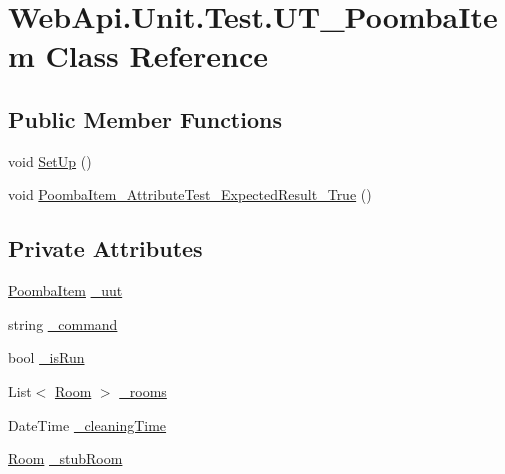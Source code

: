 \hypertarget{class_web_api_1_1_unit_1_1_test_1_1_u_t___poomba_item}{}\section{Web\+Api.\+Unit.\+Test.\+U\+T\+\_\+\+Poomba\+Item Class Reference}
\label{class_web_api_1_1_unit_1_1_test_1_1_u_t___poomba_item}
\subsection*{Public Member Functions}
\begin{DoxyCompactItemize}
\item 
void \mbox{\hyperlink{class_web_api_1_1_unit_1_1_test_1_1_u_t___poomba_item_a08fa150e21140cb190dda15f1e67de2b}{Set\+Up}} ()
\item 
void \mbox{\hyperlink{class_web_api_1_1_unit_1_1_test_1_1_u_t___poomba_item_a144b10986a6116657c00b05421628a8f}{Poomba\+Item\+\_\+\+Attribute\+Test\+\_\+\+Expected\+Result\+\_\+\+True}} ()
\end{DoxyCompactItemize}
\subsection*{Private Attributes}
\begin{DoxyCompactItemize}
\item 
\mbox{\hyperlink{class_f_w_p_s_1_1_models_1_1_poomba_item}{Poomba\+Item}} \mbox{\hyperlink{class_web_api_1_1_unit_1_1_test_1_1_u_t___poomba_item_a670779d1c26b4a66b803a989f82eeab2}{\+\_\+uut}}
\item 
string \mbox{\hyperlink{class_web_api_1_1_unit_1_1_test_1_1_u_t___poomba_item_a204641a305d12379f7a3e627c7f9b379}{\+\_\+command}}
\item 
bool \mbox{\hyperlink{class_web_api_1_1_unit_1_1_test_1_1_u_t___poomba_item_a63dd452803567e31b6ffd41a7b227da0}{\+\_\+is\+Run}}
\item 
List$<$ \mbox{\hyperlink{class_f_w_p_s_1_1_models_1_1_room}{Room}} $>$ \mbox{\hyperlink{class_web_api_1_1_unit_1_1_test_1_1_u_t___poomba_item_a7c81bc7a0503c17bde8c9f0ea43d08d3}{\+\_\+rooms}}
\item 
Date\+Time \mbox{\hyperlink{class_web_api_1_1_unit_1_1_test_1_1_u_t___poomba_item_a22024cd9977a83a6692c7d86a2cecb10}{\+\_\+cleaning\+Time}}
\item 
\mbox{\hyperlink{class_f_w_p_s_1_1_models_1_1_room}{Room}} \mbox{\hyperlink{class_web_api_1_1_unit_1_1_test_1_1_u_t___poomba_item_a87ea9f7a8fe9041fba029b1d6f441762}{\+\_\+stub\+Room}}
\end{DoxyCompactItemize}


